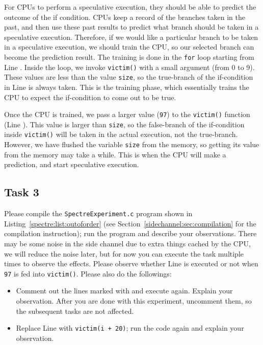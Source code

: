 For CPUs to perform a speculative execution, they should be able to
predict the outcome of the if condition.  CPUs keep a record of the branches taken in the past,
and then use these past results to predict what branch should be taken in a 
speculative execution. 
Therefore, if we would like a particular branch to be taken in 
a speculative execution, we should train the CPU, so our selected branch 
can become the prediction result. The training is done 
in the \texttt{for} loop starting from Line . 
Inside the loop, we invoke \texttt{victim()} with a small argument (from 0 to 9). These values are
less than the value \texttt{size}, so the true-branch of the if-condition in Line  is
always taken. This is the training phase, which essentially trains the CPU to expect the 
if-condition to come out to be true. 


Once the CPU is trained, we pass a larger value (\texttt{97})
to the \texttt{victim()} function (Line ). This value is larger than \texttt{size},
so the false-branch of the if-condition inside \texttt{victim()} will be taken in
the actual execution, not the true-branch. However, we have flushed the variable \texttt{size}
from the memory, so getting its value from the memory may take a while. This is when the CPU
will make a prediction, and start speculative execution. 


\subsection{Task 3} 


Please compile the \texttt{SpectreExperiment.c} program 
shown in Listing~\ref{spectre:list:outoforder} (see Section~\ref{sidechannel:sec:compilation}
for the compilation instruction); 
run the program and describe your observations. 
There may be some noise in the side channel due to extra things cached by the
CPU, we will reduce the noise later, but for now you can execute the task multiple times to
observe the effects. Please observe whether Line  is executed 
or not when \texttt{97} is fed into \texttt{victim()}.  
Please also do the followings:

\begin{itemize}
\item Comment out the lines marked with  and execute again. Explain your
observation. After you are done with this experiment, 
uncomment them, so the subsequent tasks are not affected.

\item Replace Line  with \texttt{victim(i + 20)}; run the code again and
explain your observation. 
\end{itemize}
 



